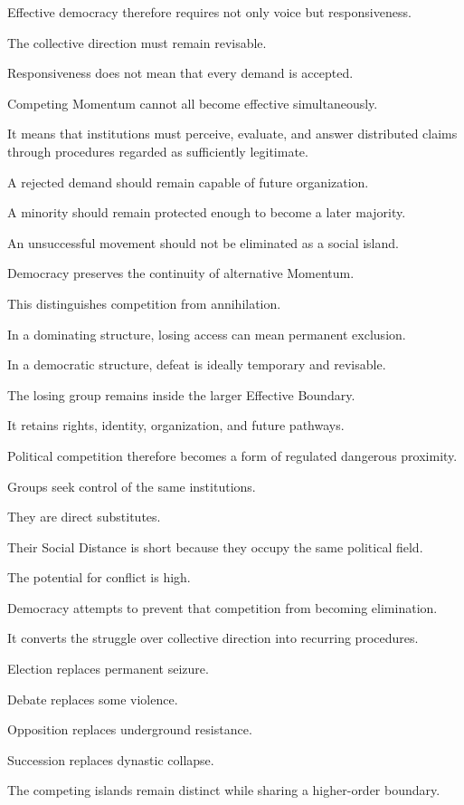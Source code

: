 Effective democracy therefore requires not only voice but responsiveness.

The collective direction must remain revisable.

Responsiveness does not mean that every demand is accepted.

Competing Momentum cannot all become effective simultaneously.

It means that institutions must perceive, evaluate, and answer distributed claims through procedures regarded as sufficiently legitimate.

A rejected demand should remain capable of future organization.

A minority should remain protected enough to become a later majority.

An unsuccessful movement should not be eliminated as a social island.

Democracy preserves the continuity of alternative Momentum.

This distinguishes competition from annihilation.

In a dominating structure, losing access can mean permanent exclusion.

In a democratic structure, defeat is ideally temporary and revisable.

The losing group remains inside the larger Effective Boundary.

It retains rights, identity, organization, and future pathways.

Political competition therefore becomes a form of regulated dangerous proximity.

Groups seek control of the same institutions.

They are direct substitutes.

Their Social Distance is short because they occupy the same political field.

The potential for conflict is high.

Democracy attempts to prevent that competition from becoming elimination.

It converts the struggle over collective direction into recurring procedures.

Election replaces permanent seizure.

Debate replaces some violence.

Opposition replaces underground resistance.

Succession replaces dynastic collapse.

The competing islands remain distinct while sharing a higher-order boundary.

